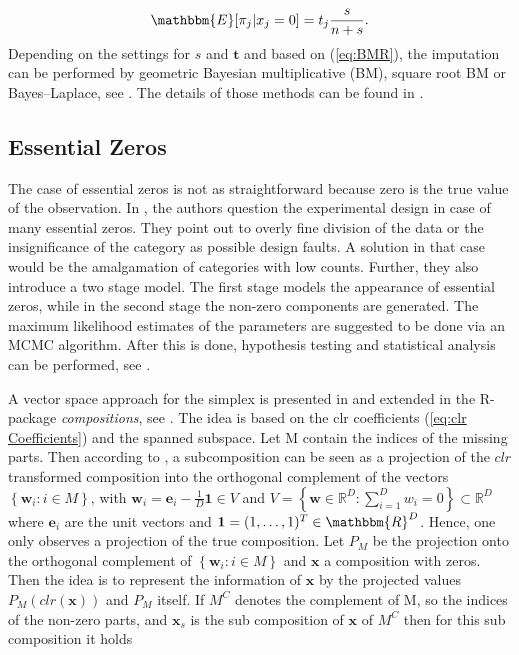\begin{equation}
\mathbbm{E}[\pi_j|x_j=0]=t_j \frac{s}{n+s}.
\label{eq:BMR}
\end{equation}
%
Depending on the settings for $s$ and $\bm{t}$ and based on (\ref{eq:BMR}), the imputation can be performed by geometric Bayesian multiplicative (BM), square root BM or Bayes–Laplace, see \textcite{Palarea-Albaladejo:2015}. The details of those methods can be found in \textcite{Fernandez:2015}. 


\subsection{Essential Zeros}
\label{sec: Essential Zeros}

The case of essential zeros is not as straightforward because zero is the true value of the observation. In \textcite{Aitchison:2003}, the authors question the experimental design in case of many essential zeros. They point out to overly fine division of the data or the insignificance of the category as possible design faults. A solution in that case would be the amalgamation of categories with low counts. Further, they also introduce a two stage model. The first stage models the appearance of essential zeros, while in the second stage the non-zero components are generated. The maximum likelihood estimates of the parameters are suggested to be done via an MCMC algorithm. After this is done, hypothesis testing and statistical analysis can be performed, see \textcite{Aitchison:2003}. 

A vector space approach for the simplex is presented in \textcite{Boogaart:2006} and extended in the R-package \textit{compositions}, see \textcite{Compositions:2023}. The idea is based on the clr coefficients (\ref{eq:clr Coefficients}) and the spanned subspace. Let M contain the indices of the missing parts. Then according to \textcite{Egozcue:2005}, a subcomposition can be seen as a projection of the $clr$ transformed composition into the orthogonal complement of the vectors $\left\{\bm{w}_i: i \in M\right\}$, with $\bm{w}_i = \bm{e}_i - \frac{1}{D}\bm{1} \in V$ and $V = \left\{\textbf{w} \in \mathbb{R}^D: \sum_{i=1}^D w_i=0\right\} \subset \mathbb{R}^D$ where $\bm{e}_i$ are the unit vectors and $\bm{1}=(1,\ldots,1)^T \in \mathbbm{R}^D$. Hence, one only observes a projection of the true composition. Let $P_M$ be the projection onto the orthogonal complement of $\left\{\bm{w}_i: i \in M\right\}$ and $\bm{x}$ a composition with zeros. Then the idea is to represent the information of $\bm{x}$ by the projected values $P_M(clr(\bm{x}))$ and $P_M$ itself. If $M^C$ denotes the complement of M, so the indices of the non-zero parts, and $\bm{x}_s$ is the sub composition of $\bm{x}$ of $M^C$ then for this sub composition it holds 

